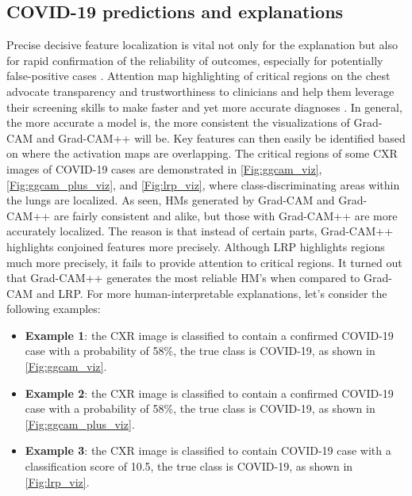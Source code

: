 \documentclass[conference]{IEEEtran}
\begin{document}
\subsection{COVID-19 predictions and explanations}
\label{sub:expl}
Precise decisive feature localization is vital not only for the explanation but also for rapid confirmation of the reliability of outcomes, especially for potentially false-positive cases \cite{chattopadhay2018grad}. Attention map highlighting of critical regions on the chest advocate transparency and trustworthiness to clinicians and help them leverage their screening skills to make faster and yet more accurate diagnoses \cite{wang2020covid}. 
In general, the more accurate a model is, the more consistent the visualizations of Grad-CAM and Grad-CAM++ will be. Key features can then easily be identified based on where the activation maps are overlapping. The critical regions of some CXR images of COVID-19 cases are demonstrated in \cref{Fig:ggcam_viz}, \cref{Fig:ggcam_plus_viz}, and \cref{Fig:lrp_viz}, where class-discriminating areas within the lungs are localized.
As seen, HMs generated by Grad-CAM and Grad-CAM++ are fairly consistent and alike, but those with Grad-CAM++ are more accurately localized. The reason is that instead of certain parts, Grad-CAM++ highlights conjoined features more precisely.
Although LRP highlights regions much more precisely, it fails to provide attention to critical regions. It turned out that Grad-CAM++ generates the most reliable HM's when compared to Grad-CAM and LRP. For more human-interpretable explanations, let's consider the following examples: 

\begin{itemize}
    \item \textbf{Example 1}: the CXR image is classified to contain a confirmed COVID-19 case with a probability of 58\%, the true class is COVID-19, as shown in \cref{Fig:ggcam_viz}. 
    \item \textbf{Example 2}: the CXR image is classified to contain a confirmed COVID-19 case with a probability of 58\%, the true class is COVID-19, as shown in \cref{Fig:ggcam_plus_viz}. 
    \item \textbf{Example 3}: the CXR image is classified to contain COVID-19 case with a classification score of 10.5, the true class is COVID-19, as shown in \cref{Fig:lrp_viz}.
\end{itemize}
\end{document}
